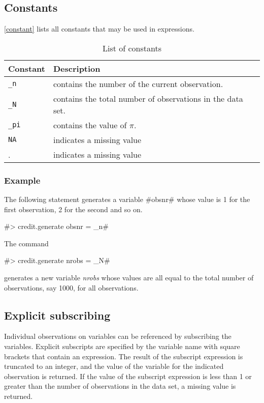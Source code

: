 \subsection{Constants}
 
 \index{$\pi$} 

\autoref{constant} lists all constants that may be used in expressions.


\begin{table}[ht]
\begin{center}
\begin{tabular}{|l|l|}
\hline
Constant & Description \\
\hline \hline
\texttt{\_n} & contains the number of the current observation.  \\
\texttt{\_N }& contains the total number of observations in the data set. \\
\texttt{\_pi} & contains the value of $\pi$. \\
\texttt{NA} & indicates a missing value \\
.  & indicates a missing value \\

\hline
\end{tabular}
{\em \caption{\label{constant} List of constants}}
\end{center}
\end{table}


\subsubsection*{Example}

The following statement generates a variable #obsnr# whose value
is 1 for the first observation, 2 for the second and so on.

#> credit.generate obsnr = _n#

The command

#> credit.generate nrobs = _N#

generates a new variable {\em nrobs} whose values are all equal to
the total number of observations, say 1000, for all observations.

\subsection{Explicit subscribing}
 

Individual observations on variables can be referenced by
subscribing the variables. Explicit subscripts are specified by
the variable name with square brackets that contain an expression.
The result of the subscript expression is truncated to an integer,
and the value of the variable for the indicated observation is
returned. If  the value of the subscript expression is less than 1
or greater than the number of observations in the data set,
a missing value is returned.

